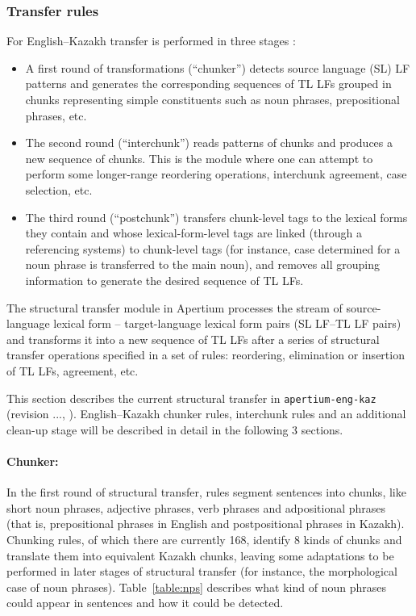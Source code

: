 \documentclass[11pt]{article}
\begin{document}
\subsubsection{Transfer rules}

For English--Kazakh transfer is performed in three stages \citep{sundetova13b}:

\begin{itemize}
\item A first round of transformations (``chunker'') detects source language (SL) LF patterns and generates the 
  corresponding sequences of TL LFs grouped in chunks representing simple constituents such as noun phrases, prepositional phrases, etc. 
\item The second round (``interchunk'') reads patterns of chunks and produces a new sequence of chunks. This is the 
  module where one can attempt to perform some longer-range reordering operations, interchunk agreement, case selection, etc. 
\item The third round (``postchunk'') transfers chunk-level tags to the lexical forms they contain and whose lexical-form-level 
  tags are linked (through a referencing systems) to chunk-level tags (for instance, case determined for a noun phrase is 
  transferred to the main noun), and removes all grouping information to generate the desired sequence of TL LFs.
\end{itemize}

The structural transfer module in Apertium processes the stream of source-language lexical form -- target-language lexical 
form pairs (SL LF–TL LF pairs) and transforms it into a new sequence of TL LFs after a series of structural transfer 
operations specified in a set of rules: reordering, elimination or insertion of TL LFs, agreement, etc. 

This section describes the current structural transfer in \texttt{apertium-eng-kaz} (revision ..., ). English--Kazakh 
chunker rules, interchunk rules and an additional clean-up stage will be described in detail in the following 3 sections. 

\paragraph{Chunker:}
In the first round of structural transfer, rules segment sentences into chunks, like short noun 
phrases, adjective phrases, verb phrases and adpositional phrases (that is, prepositional phrases in English and 
postpositional phrases in Kazakh).
Chunking rules, of which there are currently 168, identify 8 kinds of chunks and translate them into equivalent Kazakh chunks, leaving some adaptations to be performed in later stages of structural transfer (for instance, the 
morphological case of noun phrases). Table~\ref{table:nps} describes what kind of noun phrases could appear in sentences and how it could be detected.
\end{document}
